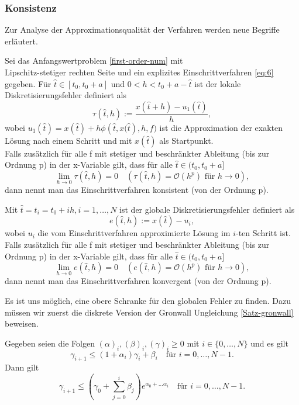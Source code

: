\subsubsection{Konsistenz}
Zur Analyse der Approximationsqualität der Verfahren werden neue Begriffe erläutert.
\begin{definition}
    Sei das Anfangswertproblem \eqref{first-order-num} mit \\ Lipschitz-stetiger
    rechten Seite und ein explizites Einschrittverfahren \eqref{eq:6} gegeben. Für $\hat{t}\in [t_0,t_0+a]$ und
    $0 < h < t_0 + a - \hat{t}$ ist der lokale Diskretisierungsfehler definiert als
    \[
        \tau(\hat{t}, h) := \frac{x(\hat{t} + h) - u_1(\hat{t})}{h},
    \] wobei $u_1(\hat{t})=x(\hat{t}) + h\phi\left(\hat{t},x(\hat{t}\right),h,f) $ ist die Approximation der exakten
    Lösung nach einem Schritt und mit $x(\hat{t})$ als Startpunkt.\\
    Falls zusätzlich für alle f mit stetiger und beschränkter Ableitung (bis zur Ordnung p) in der x-Variable gilt, dass
    für alle $\hat{t} \in (t_0, t_0+a]$
    \[
        \lim_{h \rightarrow 0 } \tau(\hat{t}, h)=0 \quad (\tau(\hat{t},h) = \mathcal{O}(h^p) \text{ für } h \rightarrow 0),
    \] dann nennt man das Einschrittverfahren konsistent (von der Ordnung p).
\end{definition}
\begin{definition}
    Mit $\hat{t} = t_i = t_0+ih, i=1,\dots, N$ ist der globale Diskretisierungsfehler definiert als
    \[
        e(\hat{t}, h) := x(\hat{t}) - u_i,
    \]
    wobei $u_i$ die vom Einschrittverfahren approximierte Lösung im $i$-ten Schritt ist.\\
    Falls zusätzlich für alle f mit stetiger und beschränkter Ableitung (bis zur Ordnung p) in der x-Variable gilt, dass
    für alle $\hat{t} \in (t_0, t_0+a]$
    \[
        \lim_{h \rightarrow 0 } e(\hat{t}, h)=0 \quad (e(\hat{t},h) = \mathcal{O}(h^p) \text{ für } h \rightarrow 0),
    \] dann nennt man das Einschrittverfahren konvergent (von der Ordnung p).
\end{definition}
Es ist uns möglich, eine obere Schranke für den globalen Fehler zu finden. Dazu müssen wir zuerst die diskrete Version
der Gronwall Ungleichung \ref{Satz-gronwall} beweisen.
\begin{satz}
    Gegeben seien die Folgen $(\alpha)_i,(\beta)_i,(\gamma)_i \geq 0$ mit $i \in \{0,\dots,N\}$ und es gilt
    \[
        \gamma_{i+1} \leq (1 + \alpha_i)\gamma_i + \beta_i \quad \text{für } i=0,\dots,N-1.
    \] Dann gilt
    \[
        \gamma_{i+1} \leq \left( \gamma_0 + \sum_{j=0}^{i}\beta_j \right) e^{\alpha_0 + \dots \alpha_i}  \quad
        \text{für } i=0, \dots, N-1.
    \]
\end{satz}
